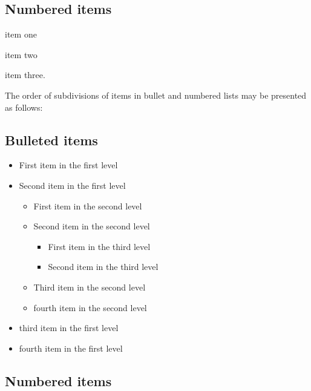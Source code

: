 \documentclass{ws-ijcm}
\begin{document}
\subsection*{Numbered items}

\begin{arabiclist}
\item item one
\item item two
\item item three.
\end{arabiclist}

The order of subdivisions of items in bullet and numbered lists may be
presented as follows:

\subsection*{Bulleted items}

\begin{itemize}
\item First item in the first level
\item Second item in the first level
\begin{itemize}
\item First item in the second level 
\item Second item in the second level
\begin{itemize}
\item First item in the third level 
\item Second item in the third level
\end{itemize}
\item Third item in the second level
\item fourth item in the second level
\end{itemize}
\item third item in the first level
\item fourth item in the first level
\end{itemize}

\subsection*{Numbered items}
\end{document}
